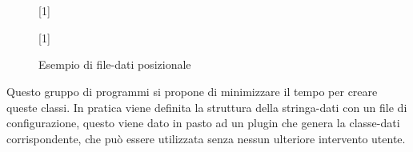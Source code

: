 \documentclass[a4paper,10pt]{report}
\begin{document}
\begin{figure}[!htb]
\centering\small
\scalebox{0.7}[1]{
\texttt{%
\fbox[lb]{ }%
\fbox[lb]{ }%
\fbox[lb]{ }%
\fbox[lb]{ }%
\fbox[lb]{ }%
\fbox[lb]{ }%
\fbox[lb]{ }%
\fbox[lb]{ }%
\fbox[lb]{ }%
\fbox[lb]{ }%
\fbox[lb]{ }%
\fbox[lb]{ }%
\fbox[lb]{ }%
\fbox[lb]{ }%
\fbox[lb]{ }%
\fbox[lb]{ }%
\fbox[lb]{ }%
\fbox[lb]{ }%
\fbox[lb]{ }%
\fbox[lb]{ }%
}}


\scalebox{0.7}[1]{
\texttt{%
\fbox[lb]{ }%
\fbox[lb]{ }%
\fbox[lb]{ }%
\fbox[lb]{ }%
\fbox[lb]{ }%
\fbox[lb]{ }%
\fbox[lb]{ }%
\fbox[lb]{ }%
\fbox[lb]{ }%
\fbox[lb]{ }%
\fbox[lb]{ }%
\fbox[lb]{ }%
\fbox[lb]{ }%
\fbox[lb]{ }%
\fbox[lb]{ }%
\fbox[lb]{ }%
\fbox[lb]{ }%
\fbox[lb]{ }%
\fbox[lb]{ }%
\fbox[lb]{ }%
\fbox[lb]{ }%
}}

\caption{Esempio di file-dati posizionale} 
\label{fig:str.data}
\end{figure}



Questo gruppo di programmi si propone di minimizzare il tempo per creare queste
classi. In pratica viene definita la struttura della stringa-dati con un file di
configurazione, questo viene dato in pasto ad un plugin che genera la 
classe-dati corrispondente, che può essere utilizzata senza nessun ulteriore
intervento utente.
\end{document}
